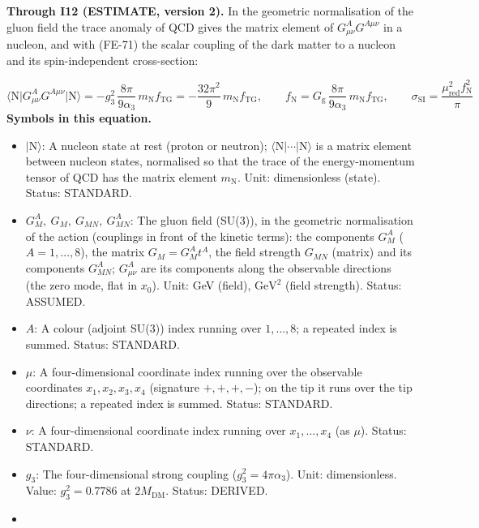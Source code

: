 \documentclass[
  10pt,
]{article}
\providecommand{\tightlist}{%
  \setlength{\itemsep}{0pt}\setlength{\parskip}{0pt}}
\begin{document}
\textbf{Through I12 (ESTIMATE, version 2).} In the geometric
normalisation of the gluon field the trace anomaly of QCD gives the
matrix element of \(G^A_{\mu\nu}G^{A\mu\nu}\) in a nucleon, and with
(FE-71) the scalar coupling of the dark matter to a nucleon and its
spin-independent cross-section:

\[ \langle\mathrm{N}\rvert G^A_{\mu\nu}G^{A\mu\nu}\lvert\mathrm{N}\rangle = -g_3^2\,\frac{8\pi}{9\alpha_3}\,m_{\mathrm{N}}f_{\mathrm{TG}} = -\frac{32\pi^2}{9}\,m_{\mathrm{N}}f_{\mathrm{TG}},\qquad f_{\mathrm{N}} = G_{\mathrm{g}}\,\frac{8\pi}{9\alpha_3}\,m_{\mathrm{N}}f_{\mathrm{TG}},\qquad \sigma_{\mathrm{SI}} = \frac{\mu_{\mathrm{red}}^2f_{\mathrm{N}}^2}{\pi} \]
\textbf{Symbols in this equation.}

\begin{itemize}
\tightlist
\item
  \(\lvert\mathrm{N}\rangle\): A nucleon state at rest (proton or
  neutron); \(\langle\mathrm{N}\rvert\cdots\lvert\mathrm{N}\rangle\) is
  a matrix element between nucleon states, normalised so that the trace
  of the energy-momentum tensor of QCD has the matrix element
  \(m_{\mathrm{N}}\). Unit: dimensionless (state). Status: STANDARD.
\item
  \(G^A_M,\ G_M,\ G_{MN},\ G^A_{MN}\): The gluon field (SU(3)), in the
  geometric normalisation of the action (couplings in front of the
  kinetic terms): the components \(G^A_M\) (\(A = 1, \dots, 8\)), the
  matrix \(G_M = G^A_Mt^A\), the field strength \(G_{MN}\) (matrix) and
  its components \(G^A_{MN}\); \(G^A_{\mu\nu}\) are its components along
  the observable directions (the zero mode, flat in \(x_0\)). Unit: GeV
  (field), \(\mathrm{GeV}^{2}\) (field strength). Status: ASSUMED.
\item
  \(A\): A colour (adjoint SU(3)) index running over \(1, \dots, 8\); a
  repeated index is summed. Status: STANDARD.
\item
  \(\mu\): A four-dimensional coordinate index running over the
  observable coordinates \(x_1, x_2, x_3, x_4\) (signature \(+,+,+,-\));
  on the tip it runs over the tip directions; a repeated index is
  summed. Status: STANDARD.
\item
  \(\nu\): A four-dimensional coordinate index running over
  \(x_1, \dots, x_4\) (as \(\mu\)). Status: STANDARD.
\item
  \(g_3\): The four-dimensional strong coupling
  (\(g_3^2 = 4\pi\alpha_3\)). Unit: dimensionless. Value:
  \(g_3^2 = 0.7786\) at \(2M_{\mathrm{DM}}\). Status: DERIVED.
\item

\end{itemize}
\end{document}
